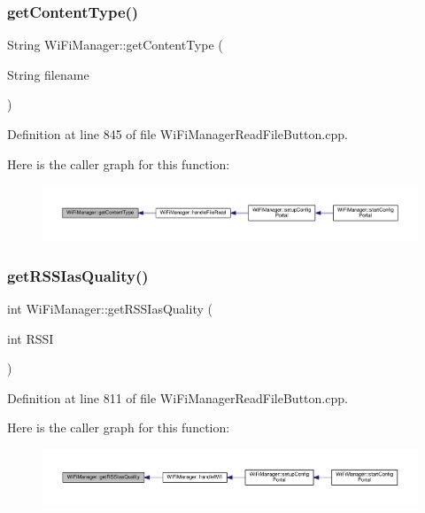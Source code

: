 \subsubsection{\texorpdfstring{get\+Content\+Type()}{getContentType()}}
{\footnotesize\ttfamily String Wi\+Fi\+Manager\+::get\+Content\+Type (\begin{DoxyParamCaption}\item[{String}]{filename }\end{DoxyParamCaption})\hspace{0.3cm}{\ttfamily [private]}}



Definition at line 845 of file Wi\+Fi\+Manager\+Read\+File\+Button.\+cpp.

Here is the caller graph for this function\+:\nopagebreak
\begin{figure}[H]
\begin{center}
\leavevmode
\includegraphics[width=350pt]{class_wi_fi_manager_a40f123fd290c3e331c9785d19a88f3b8_icgraph}
\end{center}
\end{figure}
\mbox{\label{class_wi_fi_manager_ae71cfd6bd70ada2ca02e1d20b152d0e5}} 
\subsubsection{\texorpdfstring{get\+R\+S\+S\+Ias\+Quality()}{getRSSIasQuality()}}
{\footnotesize\ttfamily int Wi\+Fi\+Manager\+::get\+R\+S\+S\+Ias\+Quality (\begin{DoxyParamCaption}\item[{int}]{R\+S\+SI }\end{DoxyParamCaption})\hspace{0.3cm}{\ttfamily [private]}}



Definition at line 811 of file Wi\+Fi\+Manager\+Read\+File\+Button.\+cpp.

Here is the caller graph for this function\+:\nopagebreak
\begin{figure}[H]
\begin{center}
\leavevmode
\includegraphics[width=350pt]{class_wi_fi_manager_ae71cfd6bd70ada2ca02e1d20b152d0e5_icgraph}
\end{center}
\end{figure}
\mbox{\label{class_wi_fi_manager_ac924dc071144e609afcf52073176c11f}} 
